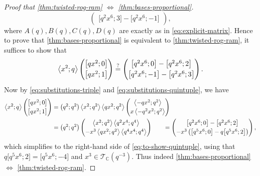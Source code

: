 \documentclass[reqno,11pt]{amsart}
\theoremstyle{definition}
\theoremstyle{remark}
\numberwithin{equation}{section}
\newcommand{\C}{\mathbb{C}}
\newcommand{\mT}{\mathcal{T}}
\newcommand{\la}{\left\langle}
\newcommand{\ra}{\right\rangle}
\newcommand{\vect}[2]{\big[{#1};{#2}\big]}
\begin{document}
\begin{proof}[Proof that \cref{thm:twisted-rog-ram} $\Leftrightarrow$ \cref{thm:bases-proportional}]
\[\begin{pmatrix}
    \vect{q^2x^6}{3} - \vect{q^2x^6}{-1}
    \end{pmatrix},
\]
where $A(q), B(q), C(q), D(q)$ are exactly as in \cref{eq:explicit-matrix}. Hence to prove that \cref{thm:bases-proportional} is equivalent to \cref{thm:twisted-rog-ram}, it suffices to show that
\begin{equation} \label{eq:to-show-quintuple}
    \la x^2; q \ra 
    \begin{pmatrix}
    \vect{qx^2}{0}
    \vspace{0.1cm} \\
    \vect{qx^2}{1}
    \end{pmatrix}
    \stackrel{?}{=}
    \begin{pmatrix}
    \vect{q^2x^6}{0} - \vect{q^2x^6}{2}
    \vspace{0.1cm} \\
    \vect{q^2x^6}{-1} - \vect{q^2x^6}{3}
    \end{pmatrix}.
\end{equation}
Now by \cref{eq:substitutions-triple} and \cref{eq:substitutions-quintuple}, we have
\[
\begin{aligned}
    \la x^2; q \ra 
    \begin{pmatrix}
    \vect{qx^2}{0}
    \vspace{0.1cm} \\
    \vect{qx^2}{1}
    \end{pmatrix}
    &=
    \left(q^2; q^2\right) 
    \la x^2; q^2 \ra 
    \la qx^2; q^2 \ra 
    \begin{pmatrix}
    \la -qx^2; q^2 \ra
    \vspace{0.1cm} \\
    x\la -q^2 x^2; q^2 \ra
    \end{pmatrix}
    \\
    &=
    \left(q^2; q^2\right) 
    \begin{pmatrix}
    \la x^2; q^2 \ra \la q^2x^4; q^4 \ra
    \vspace{0.1cm} \\
    -x^3\la qx^2; q^2 \ra \la q^4x^4; q^4 \ra
    \end{pmatrix}
    \qquad
    =
    \begin{pmatrix}
    \vect{q^2x^6}{0} - \vect{q^2x^6}{2}
    \vspace{0.1cm} \\
    -x^3\left(\vect{q^5x^6}{0} - q\vect{q^5x^6}{2}\right)
    \end{pmatrix},
\end{aligned}
\]
which simplifies to the right-hand side of \cref{eq:to-show-quintuple}, using that $q\vect{q^5 x^6}{2} = \vect{q^5x^6}{-4}$ and $x^3 \in \mT_\C\left(q^{-3}\right)$. Thus indeed \cref{thm:bases-proportional} $\Leftrightarrow$ \cref{thm:twisted-rog-ram}.
\end{proof}
\end{document}
